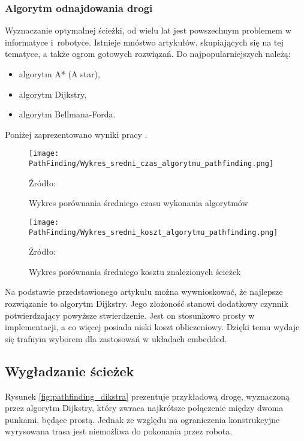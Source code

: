         \subsubsection{Algorytm odnajdowania drogi}
        \label{subsec:algorytm_odnajdowania_ścieżek}
            Wyznaczanie optymalnej ścieżki, od wielu lat jest powszechnym problemem w informatyce i~robotyce.
            Istnieje mnóstwo artykułów, skupiających się na tej tematyce, a także ogrom gotowych rozwiązań.
            Do najpopularniejszych należą:
            \begin{itemize}
                \item algorytm A* (A star),
                \item algorytm Dijkstry,
                \item algorytm Bellmana-Forda.
            \end{itemize}

            Poniżej zaprezentowano wyniki pracy  \cite{AnalizaAlgorytmówŚcieżek}.
            \begin{figure}[!ht]
                \centering
                \texttt{[image: PathFinding/Wykres\_sredni\_czas\_algorytmu\_pathfinding.png]}
                \caption{Wykres porównania średniego czasu wykonania algorytmów}
                Źródło:\cite{AnalizaAlgorytmówŚcieżek} 
                \label{fig:PathFindingTime}
            \end{figure}
            \begin{figure}[!ht]
                \centering
                \texttt{[image: PathFinding/Wykres\_sredni\_koszt\_algorytmu\_pathfinding.png]}
                \caption{Wykres porównania średniego kosztu znalezionych ścieżek}
                Źródło:\cite{AnalizaAlgorytmówŚcieżek} 
                \label{fig:PathFindingCost}
            \end{figure}

\newpage
            Na podstawie przedstawionego artykułu można wywnioskować, że najlepsze rozwiązanie to algorytm Dijkstry.
            Jego złożoność stanowi dodatkowy czynnik potwierdzający powyższe stwierdzenie.
            Jest on stosunkowo prosty w implementacji, a co więcej posiada niski koszt obliczeniowy.
            Dzięki temu wydaje się trafnym wyborem dla zastosowań w układach embedded.

    \subsection{Wygładzanie ścieżek}
    \label{subsec:wygładzanie_ścieżek}
        Rysunek \ref{fig:pathfinding_dikstra} prezentuje przykładową drogę, wyznaczoną przez algorytm Dijkstry,
        który zwraca najkrótsze połączenie między dwoma punkami, będące prostą.
        Jednak ze względu na ograniczenia konstrukcyjne wyrysowana trasa jest niemożliwa do pokonania przez robota.

